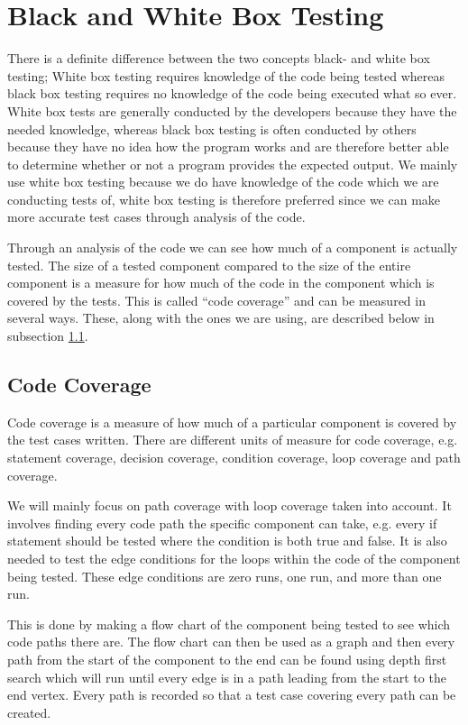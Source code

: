 \section{Black and White Box Testing}
\label{chap:whiteBox}
There is a definite difference between the two concepts black- and white box testing;
White box testing requires knowledge of the code being tested whereas black box testing requires no knowledge of the code being executed what so ever.
White box tests are generally conducted by the developers because they have the needed knowledge, whereas black box testing is often conducted by others because they have no idea how the program works and are therefore better able to determine whether or not a program provides the expected output.
We mainly use white box testing because we do have knowledge of the code which we are conducting tests of, white box testing is therefore preferred since we can make more accurate test cases through analysis of the code.

Through an analysis of the code we can see how much of a component is actually tested.
The size of a tested component compared to the size of the entire component is a measure for how much of the code in the component which is covered by the tests.
This is called ``code coverage'' and can be measured in several ways.
These, along with the ones we are using, are described below in subsection \ref{sub:codeCoverage}.

\subsection{Code Coverage}
\label{sub:codeCoverage}
Code coverage is a measure of how much of a particular component is covered by the test cases written. \cite{cornett10}
There are different units of measure for code coverage, e.g. statement coverage, decision coverage, condition coverage, loop coverage and path coverage.

We will mainly focus on path coverage with loop coverage taken into account.
It involves finding every code path the specific component can take, e.g. every if statement should be tested where the condition is both true and false.
It is also needed to test the edge conditions for the loops within the code of the component being tested.
These edge conditions are zero runs, one run, and more than one run.

This is done by making a flow chart of the component being tested to see which code paths there are.
The flow chart can then be used as a graph and then every path from the start of the component to the end can be found using depth first search which will run until every edge is in a path leading from the start to the end vertex.
Every path is recorded so that a test case covering every path can be created. \cite{whiteBox}

